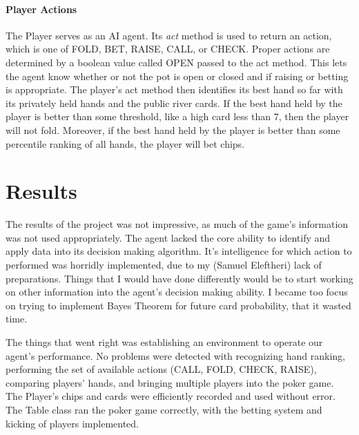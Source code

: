 \documentclass[10pt, a4paper, twocolumn]{article} %
\newcommand*\Hs[1]{\ensuremath{{\color{blue} #1}{\color{red}\varheartsuit}}}
\newcommand*\Cs[1]{\ensuremath{{\color{blue} #1}{\color{black}\clubsuit}}}
\begin{document}
\paragraph{Player Actions}
The Player serves as an AI agent. Its \textit{act} method is used to return an action, which is one of FOLD, BET, RAISE, CALL, or CHECK. Proper actions are determined by a boolean value called OPEN passed to the act method. This lets the agent know whether or not the pot is open or closed and if raising or betting is appropriate. The player's act method then identifies its best hand so far with its privately held hands and the public river cards. If the best hand held by the player is better than some threshold, like a high card less than 7, then the player will not fold. Moreover, if the best hand held by the player is better than some percentile ranking of all hands, the player will bet chips.




\section{Results}

The results of the project was not impressive, as much of the game's information was not used appropriately. The agent lacked the core ability to identify and apply data into its decision making algorithm. It's intelligence for which action to performed was horridly implemented, due to my (Samuel Eleftheri) lack of preparations. Things that I would have done differently would be to start working on other information into the agent's decision making ability. I became too focus on trying to implement Bayes Theorem for future card probability, that it wasted time.

The things that went right was establishing an environment to operate our agent's performance. No problems were detected with recognizing hand ranking, performing the set of available actions (CALL, FOLD, CHECK, RAISE), comparing players' hands, and bringing multiple players into the poker game. The Player's chips and cards were efficiently recorded and used without error. The Table class ran the poker game correctly, with the betting system and kicking of players implemented. \\ \\ \\ 
\end{document}
